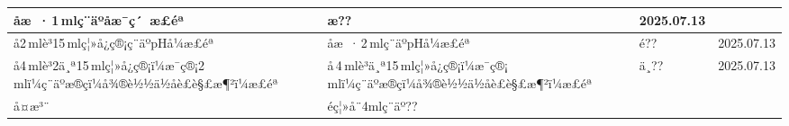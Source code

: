 \documentclass[UTF8,10pt,a4paper,fontset=fandol]{ctexart}
\newcommand{\fieldvalue}[1]{#1}
\newcommand{\handwritten}[1]{#1}
\begin{document}
\begin{tabularx}{\textwidth}{|p{2.5cm}|X|p{2.5cm}|X|}
åæ ·\underline{\hspace{0.5cm}}\,1\,mlç¨äºåæ¯ç´ æ£éª &
\fieldvalue{\handwritten{æ??}} &
\fieldvalue{\handwritten{2025.07.13}}
\\ \hline
å2\,mlè³15\,mlç¦»å¿ç®¡ç¨äºpHå¼æ£éª &
åæ ·\underline{\hspace{0.5cm}}\,2\,mlç¨äºpHå¼æ£éª &
\fieldvalue{\handwritten{é??}} &
\fieldvalue{\handwritten{2025.07.13}}
\\ \hline
å4\,mlè³2ä¸ª15\,mlç¦»å¿ç®¡ï¼æ¯ç®¡2\,mlï¼ç¨äºæ®çï¼å¾®è½½ä½åè£è§£æ¶²ï¼æ£éª &
å\underline{\hspace{0.5cm}}\,4\,mlè³\underline{\hspace{0.5cm}}ä¸ª15\,mlç¦»å¿ç®¡ï¼æ¯ç®¡\underline{\hspace{0.5cm}}\,mlï¼ç¨äºæ®çï¼å¾®è½½ä½åè£è§£æ¶²ï¼æ£éª &
\fieldvalue{\handwritten{ä¸??}} &
\fieldvalue{\handwritten{2025.07.13}}
\\ \hline
å¤æ³¨ &
\multicolumn{3}{l|}{
\fieldvalue{\handwritten{éç¦»å¨4mlç¨äº??}}
}\\ \hline
\end{tabularx}

\vspace{0.5em}
\end{document}
